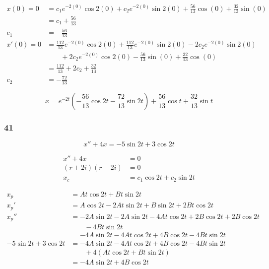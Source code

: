 \documentclass{article}
\begin{document}
\begin{enumerate}
        \begin{align*}
          x(0) = 0  & = c_1 e^{-2 (0)} \cos 2 (0) + c_2 e^{-2 (0)} \sin 2 (0) + \frac{56}{13} \cos (0) + \frac{32}{13} \sin (0)   \\
                    & = c_1 + \frac{56}{13}                                                                                       \\
          c_1       & = -\frac{56}{13}                                                                                            \\
          x'(0) = 0 & = \frac{112}{13} e^{-2 (0)} \cos 2 (0) + \frac{112}{13} e^{-2 (0)} \sin 2 (0) - 2 c_2 e^{-2 (0)} \sin 2 (0) \\
                    & \qquad + 2 c_2 e^{-2 (0)} \cos 2 (0) - \frac{56}{13} \sin (0) + \frac{32}{13} \cos (0)                      \\
                    & = \frac{112}{13} + 2 c_2 + \frac{32}{13}                                                                    \\
          c_2       & = -\frac{72}{13}
        \end{align*}

        \[x = e^{-2t} \left( -\frac{56}{13} \cos 2t - \frac{72}{13} \sin 2t \right) + \frac{56}{13} \cos t + \frac{32}{13} \sin t\]
\end{enumerate}

\subsubsection{41}

\[x'' + 4 x = -5 \sin 2t + 3 \cos 2t\]

\begin{align*}
  x'' + 4 x         & = 0                         \\
  (r + 2i) (r - 2i) & = 0                         \\
  x_c               & = c_1 \cos 2t + c_2 \sin 2t
\end{align*}

\begin{align*}
  x_p                    & = A t \cos 2t + B t \sin 2t                                              \\
  x_p'                   & = A \cos 2t - 2 A t \sin 2t + B \sin 2t + 2 B t \cos 2t                  \\
  x_p''                  & = -2 A \sin 2t - 2 A \sin 2t - 4 A t \cos 2t + 2 B \cos 2t + 2 B \cos 2t \\
                         & \qquad - 4 B t \sin 2t                                                   \\
                         & = -4 A \sin 2t - 4 A t \cos 2t + 4 B \cos 2t - 4 B t \sin 2t             \\
  -5 \sin 2t + 3 \cos 2t & = -4 A \sin 2t - 4 A t \cos 2t + 4 B \cos 2t - 4 B t \sin 2t             \\
                         & \qquad + 4 (A t \cos 2t + B t \sin 2t)                                   \\
                         & = -4 A \sin 2t + 4 B \cos 2t
\end{align*}
\end{document}
